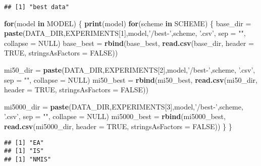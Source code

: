 \documentclass[]{book}
\newenvironment{Shaded}{\begin{snugshade}}{\end{snugshade}}
\newcommand{\ControlFlowTok}[1]{\textcolor[rgb]{0.13,0.29,0.53}{\textbf{#1}}}
\newcommand{\DataTypeTok}[1]{\textcolor[rgb]{0.13,0.29,0.53}{#1}}
\newcommand{\DecValTok}[1]{\textcolor[rgb]{0.00,0.00,0.81}{#1}}
\newcommand{\KeywordTok}[1]{\textcolor[rgb]{0.13,0.29,0.53}{\textbf{#1}}}
\newcommand{\NormalTok}[1]{#1}
\newcommand{\OtherTok}[1]{\textcolor[rgb]{0.56,0.35,0.01}{#1}}
\newcommand{\StringTok}[1]{\textcolor[rgb]{0.31,0.60,0.02}{#1}}
\begin{document}
\begin{verbatim}
## [1] "best data"
\end{verbatim}

\begin{Shaded}
\begin{Highlighting}[]
\ControlFlowTok{for}\NormalTok{(model }\ControlFlowTok{in}\NormalTok{ MODEL)}
\NormalTok{\{}
  \KeywordTok{print}\NormalTok{(model)}
  \ControlFlowTok{for}\NormalTok{(scheme }\ControlFlowTok{in}\NormalTok{ SCHEME)}
\NormalTok{  \{}
\NormalTok{    base_dir =}\StringTok{ }\KeywordTok{paste}\NormalTok{(DATA_DIR,EXPERIMENTS[}\DecValTok{1}\NormalTok{],model,}\StringTok{'/best-'}\NormalTok{,scheme, }\StringTok{'.csv'}\NormalTok{, }\DataTypeTok{sep =} \StringTok{""}\NormalTok{, }\DataTypeTok{collapse =} \OtherTok{NULL}\NormalTok{)}
\NormalTok{    base_best =}\StringTok{ }\KeywordTok{rbind}\NormalTok{(base_best, }\KeywordTok{read.csv}\NormalTok{(base_dir, }\DataTypeTok{header =} \OtherTok{TRUE}\NormalTok{, }\DataTypeTok{stringsAsFactors =} \OtherTok{FALSE}\NormalTok{))}

\NormalTok{    mi50_dir =}\StringTok{ }\KeywordTok{paste}\NormalTok{(DATA_DIR,EXPERIMENTS[}\DecValTok{2}\NormalTok{],model,}\StringTok{'/best-'}\NormalTok{,scheme, }\StringTok{'.csv'}\NormalTok{, }\DataTypeTok{sep =} \StringTok{""}\NormalTok{, }\DataTypeTok{collapse =} \OtherTok{NULL}\NormalTok{)}
\NormalTok{    mi50_best =}\StringTok{ }\KeywordTok{rbind}\NormalTok{(mi50_best, }\KeywordTok{read.csv}\NormalTok{(mi50_dir, }\DataTypeTok{header =} \OtherTok{TRUE}\NormalTok{, }\DataTypeTok{stringsAsFactors =} \OtherTok{FALSE}\NormalTok{))}

\NormalTok{    mi5000_dir =}\StringTok{ }\KeywordTok{paste}\NormalTok{(DATA_DIR,EXPERIMENTS[}\DecValTok{3}\NormalTok{],model,}\StringTok{'/best-'}\NormalTok{,scheme, }\StringTok{'.csv'}\NormalTok{, }\DataTypeTok{sep =} \StringTok{""}\NormalTok{, }\DataTypeTok{collapse =} \OtherTok{NULL}\NormalTok{)}
\NormalTok{    mi5000_best =}\StringTok{ }\KeywordTok{rbind}\NormalTok{(mi5000_best, }\KeywordTok{read.csv}\NormalTok{(mi5000_dir, }\DataTypeTok{header =} \OtherTok{TRUE}\NormalTok{, }\DataTypeTok{stringsAsFactors =} \OtherTok{FALSE}\NormalTok{))}
\NormalTok{  \}}
\NormalTok{\}}
\end{Highlighting}
\end{Shaded}

\begin{verbatim}
## [1] "EA"
## [1] "IS"
## [1] "NMIS"
\end{verbatim}
\end{document}
